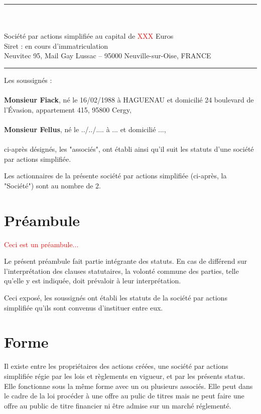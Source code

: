 \documentclass[a4paper,12pt]{report}
\newcommand{\address}{Neuvitec 95, Mail Gay Lussac -- 95000 Neuville-sur-Oise, FRANCE}
\begin{document}


\begin{center}
	\begin{minipage}{0.8\linewidth}
		\center
		\rule{\linewidth}{0.5mm}\\
		\large{}\\
		\normalsize
		Société par actions simplifiée au capital de \textcolor{red}{XXX} Euros\\
		Siret : en cours d'immatriculation\\
		\normalsize{\address}\\
		\rule{\linewidth}{0.5mm}
	\end{minipage}
\end{center}
\vspace{5mm}
\noindent Les soussignés :\\\\
\textbf{Monsieur Fiack}, né le 16/02/1988 à HAGUENAU et domicilié 24 boulevard de l'Évasion, appartement 415, 95800 Cergy,\\\\
\textbf{Monsieur Fellus}, né le ../../.... à ... et domicilié ...,\\\\
ci-après désignés, les "associés", ont établi ainsi qu'il suit les statuts d'une société par actions simplifiée.

Les actionnaires de la présente société par actions simplifiée (ci-après, la "Société") sont au nombre de 2.

\section*{Préambule}
\textcolor{red}{Ceci est un préambule...}

Le présent préambule fait partie intégrante des statuts. En cas de différend sur l'interprétation des clauses statutaires, la volonté commune des parties, telle qu'elle y est indiquée, doit prévaloir à leur interprétation.

Ceci exposé, les soussignés ont établi les statuts de la société par actions simplifiée qu'ils sont convenus d'instituer entre eux.

\section{Forme}
Il existe entre les propriétaires des actions créées, une société par actions simplifiée régie par les lois et règlements en vigueur, et par les présents status.
Elle fonctionne sous la même forme avec un ou plusieurs associés.
Elle peut dans le cadre de la loi procéder à une offre au pulic de titres mais ne peut faire une offre au public de titre financier ni être admise sur un marché réglementé.
\end{document}
